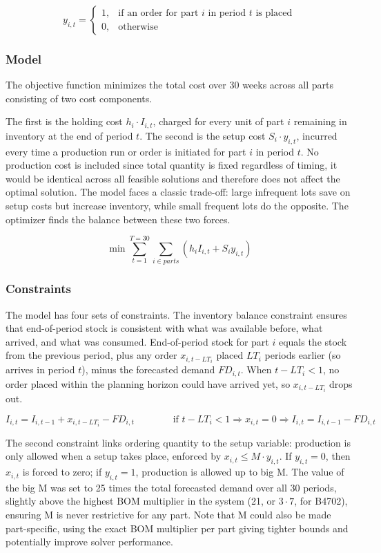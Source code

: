 \documentclass[a4paper,faculty=eb,language=en,doctype=article,sftitles=false]{ugent-doc}
\begin{document}
\[
y_{i,t} =
\begin{cases}
1, & \text{if an order for part } i \text{ in period } t \text{ is placed} \\
0, & \text{otherwise}
\end{cases}
\]

\subsubsection{Model}

The objective function minimizes the total cost over 30 weeks across all parts consisting of two cost components.

The first is the holding cost \(h_i \cdot I_{i,t}\), charged for every unit of part \(i\) remaining in inventory at the end of period \(t\). The second is the setup cost \(S_i \cdot y_{i,t}\), incurred every time a production run or order is initiated for part \(i\) in period \(t\). No production cost is included since total quantity is fixed regardless of timing, it would be identical across all feasible solutions and therefore does not affect the optimal solution. The model faces a classic trade-off: large infrequent lots save on setup costs but increase inventory, while small frequent lots do the opposite. The optimizer finds the balance between these two forces.

\[
\min \sum_{t=1}^{T=30} \sum_{i \in parts}
\left( h_i I_{i,t} + S_i y_{i,t} \right)
\]

\subsubsection{Constraints}

The model has four sets of constraints.
The inventory balance constraint ensures that end-of-period stock is consistent with what was available before, what arrived, and what was consumed. End-of-period stock for part $i$ equals the stock from the previous period, plus any order $x_{i,t-LT_i}$ placed $LT_i$ periods earlier (so arrives in period $t$), minus the forecasted demand $FD_{i,t}$. When $t - LT_i < 1$, no order placed within the planning horizon could have arrived yet, so $x_{i,t-LT_i}$ drops out.

\[
I_{i,t} = I_{i,t-1} + x_{i,t-LT_i} - FD_{i,t} \qquad\qquad \text{if } t - LT_i < 1 \Rightarrow x_{i,t} = 0 \Rightarrow I_{i,t} = I_{i,t-1} - FD_{i,t}
\]

The second constraint links ordering quantity to the setup variable: production is only allowed when a setup takes place, enforced by $x_{i,t} \leq M \cdot y_{i,t}$. If $y_{i,t} = 0$, then $x_{i,t}$ is forced to zero; if $y_{i,t} = 1$, production is allowed up to big M. The value of the big M was set to 25 times the total forecasted demand over all 30 periods, slightly above the highest BOM multiplier in the system (21, or $3 \cdot 7$, for B4702), ensuring M is never restrictive for any part. Note that M could also be made part-specific, using the exact BOM multiplier per part giving tighter bounds and potentially improve solver performance.
\end{document}
